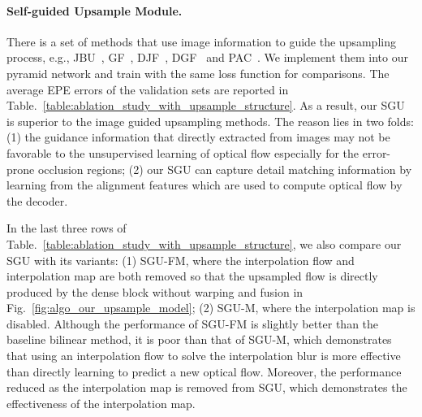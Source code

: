 \documentclass[final]{cvpr}
\begin{document}
\paragraph{Self-guided Upsample Module. }
There is a set of methods that use image information to guide the upsampling process, e.g.,
JBU~\cite{kopf2007JBU}, GF~\cite{he2010guided}, DJF~\cite{li2016deep}, DGF~\cite{wu2018fast} and PAC~\cite{su2019pac}. We implement them into our pyramid network and train with the same loss function for comparisons. The average EPE errors of the validation sets are reported in Table.~\ref{table:ablation_study_with_upsample_structure}. As a result, our SGU is superior to the image guided upsampling methods. 
The reason lies in two folds: (1) the guidance information that directly extracted from images may not be favorable to the unsupervised learning of optical flow especially for the error-prone occlusion regions; (2) our SGU can capture detail matching information by learning from the alignment features which are used to compute optical flow by the decoder. 



In the last three rows of Table.~\ref{table:ablation_study_with_upsample_structure}, we also compare our SGU with its variants: (1) SGU-FM, where the interpolation flow and interpolation map are both removed so that the upsampled flow is directly produced by the dense block without warping and fusion in Fig.~\ref{fig:algo_our_upsample_model}; (2) SGU-M, where the interpolation map is disabled. 
Although the performance of SGU-FM is slightly better than the baseline bilinear method, it is poor than that of SGU-M, which demonstrates that using an interpolation flow to solve the interpolation blur is more effective than directly learning to predict a new optical flow. Moreover, the performance reduced as the interpolation map is removed from SGU, which demonstrates the effectiveness of the interpolation map. 
\vspace{-10pt}
\end{document}
